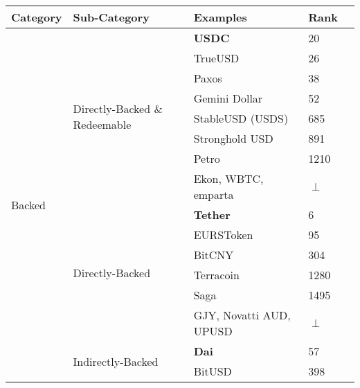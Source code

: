 \begin{table}[h!]
\centering

\begin{tabular}{|l|l|l|l|l|}

\hline
\rowcolor{lightgray}
\textbf{Category} & \textbf{Sub-Category} & \textbf{Examples} & Rank \\  \hline

\multirow{16}{*}{Backed}		& \multirow{8}{*}{Directly-Backed \& Redeemable}					& \textbf{USDC} & 20 \\ \cline{3-4}
						&														& TrueUSD & 26 \\ \cline{3-4}	
						&														& Paxos & 38 \\ \cline{3-4}												
						&														& Gemini Dollar & 52 \\ \cline{3-4}
						&														& StableUSD (USDS) & 685 \\ \cline{3-4}
						&														& Stronghold USD & 891 \\ \cline{3-4}
						&														& Petro & 1210 \\ \cline{3-4}
						&														& \multicolumn{1}{p{5cm}|}{Ekon, WBTC, emparta} & $\perp$ \\ \cline{2-4}
						& \multirow{6}{*}{Directly-Backed}  								& \textbf{Tether} & 6 \\ \cline{3-4}
						&														& EURSToken & 95 \\ \cline{3-4}
						&														& BitCNY & 304 \\ \cline{3-4}
						&														& Terracoin & 1280 \\ \cline{3-4}
						&														& Saga & 1495 \\  \cline{3-4}
						&														& \multicolumn{1}{p{5cm}|}{GJY, Novatti AUD, UPUSD} & $\perp$ \\ \cline{2-4} 						
						& \multirow{2}{*}{Indirectly-Backed}								& \textbf{Dai} & 57 \\ \cline{3-4}
                                                &														& BitUSD & 398 \\  \cline{1-4}
 
                                                                                                                 
                                                                                                                 

\end{tabular}
\end{table}
